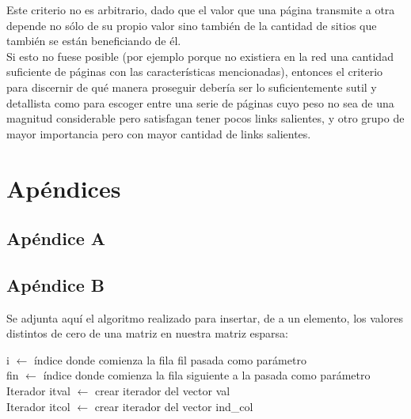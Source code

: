 \documentclass[a4paper]{article}
\begin{document}
\indent Este criterio no es arbitrario, dado que el valor que una página transmite a otra depende no sólo de su propio valor sino también de la cantidad de sitios que también se están beneficiando de él. \\
\indent Si esto no fuese posible (por ejemplo porque no existiera en la red una cantidad suficiente de páginas con las características mencionadas), entonces el criterio para discernir de qué manera proseguir debería ser lo suficientemente sutil y detallista como para escoger entre una serie de páginas cuyo peso no sea de una magnitud considerable pero satisfagan tener pocos links salientes, y otro grupo de mayor importancia pero con mayor cantidad de links salientes.\\

\newpage
\section{Ap\'endices}
	\subsection{Ap\'endice A}

		
\newpage
	\subsection{Ap\'endice B}
Se adjunta aqu\'i el algoritmo realizado para insertar, de a un elemento, los valores distintos de cero de una matriz en nuestra matriz esparsa: \\

\IncMargin{1em}
\begin{algorithm}

\BlankLine

i $\leftarrow$ \'indice donde comienza la fila fil pasada como par\'ametro \\
fin $\leftarrow$ \'indice donde comienza la fila siguiente a la pasada como par\'ametro \\
Iterador itval $\leftarrow$ crear iterador del vector val \\
Iterador itcol $\leftarrow$ crear iterador del vector ind_col \\
\end{algorithm}\DecMargin{1em}
\end{document}
